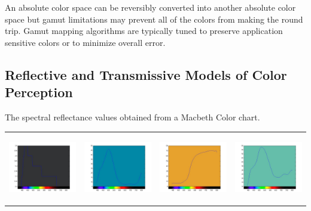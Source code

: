 An absolute color space can be reversibly converted into another absolute color space but gamut limitations may prevent all of the colors from making the round trip.  Gamut mapping algorithms are typically tuned to preserve application sensitive colors or to minimize overall error.

\subsection{Reflective and Transmissive Models of Color Perception}
The spectral reflectance values obtained from a Macbeth Color chart.

\begin{tabular}{  c c c c }
\includegraphics[width=3.0cm,height=3.0cm]{ColorPaper/ch1.jpg}
&
\includegraphics[width=3.0cm,height=3.0cm]{ColorPaper/ch2.jpg}
&
\includegraphics[width=3.0cm,height=3.0cm]{ColorPaper/ch3.jpg}
&
\includegraphics[width=3.0cm,height=3.0cm]{ColorPaper/ch4.jpg}
\\


\end{tabular}

